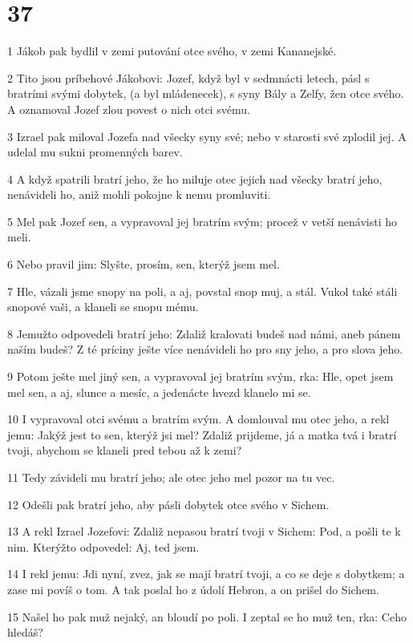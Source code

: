 \chapter{37}

\par 1 Jákob pak bydlil v zemi putování otce svého, v zemi Kananejské.
\par 2 Tito jsou príbehové Jákobovi: Jozef, když byl v sedmnácti letech, pásl s bratrími svými dobytek, (a byl mládenecek), s syny Bály a Zelfy, žen otce svého. A oznamoval Jozef zlou povest o nich otci svému.
\par 3 Izrael pak miloval Jozefa nad všecky syny své; nebo v starosti své zplodil jej. A udelal mu sukni promenných barev.
\par 4 A když spatrili bratrí jeho, že ho miluje otec jejich nad všecky bratrí jeho, nenávideli ho, aniž mohli pokojne k nemu promluviti.
\par 5 Mel pak Jozef sen, a vypravoval jej bratrím svým; procež v vetší nenávisti ho meli.
\par 6 Nebo pravil jim: Slyšte, prosím, sen, kterýž jsem mel.
\par 7 Hle, vázali jsme snopy na poli, a aj, povstal snop muj, a stál. Vukol také stáli snopové vaši, a klaneli se snopu mému.
\par 8 Jemužto odpovedeli bratrí jeho: Zdaliž kralovati budeš nad námi, aneb pánem naším budeš? Z té príciny ješte více nenávideli ho pro sny jeho, a pro slova jeho.
\par 9 Potom ješte mel jiný sen, a vypravoval jej bratrím svým, rka: Hle, opet jsem mel sen, a aj, slunce a mesíc, a jedenácte hvezd klanelo mi se.
\par 10 I vypravoval otci svému a bratrím svým. A domlouval mu otec jeho, a rekl jemu: Jakýž jest to sen, kterýž jsi mel? Zdaliž prijdeme, já a matka tvá i bratrí tvoji, abychom se klaneli pred tebou až k zemi?
\par 11 Tedy závideli mu bratrí jeho; ale otec jeho mel pozor na tu vec.
\par 12 Odešli pak bratrí jeho, aby pásli dobytek otce svého v Sichem.
\par 13 A rekl Izrael Jozefovi: Zdaliž nepasou bratrí tvoji v Sichem: Pod, a pošli te k nim. Kterýžto odpovedel: Aj, ted jsem.
\par 14 I rekl jemu: Jdi nyní, zvez, jak se mají bratrí tvoji, a co se deje s dobytkem; a zase mi povíš o tom. A tak poslal ho z údolí Hebron, a on prišel do Sichem.
\par 15 Našel ho pak muž nejaký, an bloudí po poli. I zeptal se ho muž ten, rka: Ceho hledáš?

